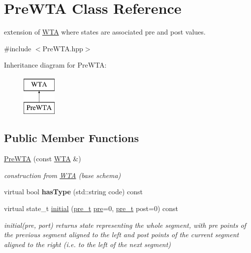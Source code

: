 \hypertarget{classPreWTA}{}\section{Pre\+W\+TA Class Reference}
\label{classPreWTA}


extension of \mbox{\hyperlink{classWTA}{W\+TA}} where states are associated pre and post values.  




{\ttfamily \#include $<$Pre\+W\+T\+A.\+hpp$>$}

Inheritance diagram for Pre\+W\+TA\+:\begin{figure}[H]
\begin{center}
\leavevmode
\includegraphics[height=2.000000cm]{classPreWTA}
\end{center}
\end{figure}
\subsection*{Public Member Functions}
\begin{DoxyCompactItemize}
\item 
\mbox{\hyperlink{group__schemata_ga6287aa82de69987b65518b4997112ac5}{Pre\+W\+TA}} (const \mbox{\hyperlink{classWTA}{W\+TA}} \&)
\begin{DoxyCompactList}\small\item\em construction from \mbox{\hyperlink{classWTA}{W\+TA}} (base schema) \end{DoxyCompactList}\item 
\mbox{\label{classPreWTA_a0cb0b8f217198e19367d88674605995e}} 
virtual bool {\bfseries has\+Type} (std\+::string code) const
\item 
virtual state\+\_\+t \mbox{\hyperlink{group__schemata_gaf47213e6243f48f06681089e03fa08ef}{initial}} (\mbox{\hyperlink{group__general_ga092fe8b972dfa977c2a0886720a7731e}{pre\+\_\+t}} \mbox{\hyperlink{group__schemata_gaab30a1faaa381ecfabd705a8c12d179b}{pre}}=0, \mbox{\hyperlink{group__general_ga092fe8b972dfa977c2a0886720a7731e}{pre\+\_\+t}} post=0) const
\begin{DoxyCompactList}\small\item\em initial(pre, port) returns state representing the whole segment, with pre points of the previous segment aligned to the left and post points of the current segment aligned to the right (i.\+e. to the left of the next segment) \end{DoxyCompactList}\end{DoxyCompactItemize}
